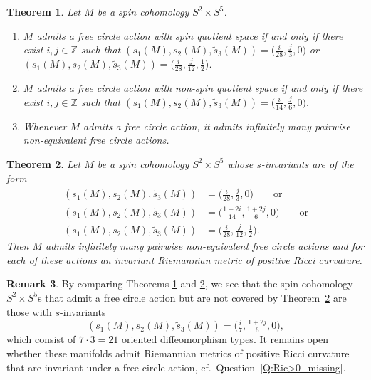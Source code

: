 \documentclass[pdftex]{sigma}
\numberwithin{equation}{section}
\newtheorem{Theorem}{Theorem}[section]
\theoremstyle{definition}
\newtheorem{Remark}[Theorem]{Remark}
\numberwithin{table}{section}
\newcommand{\Z}{\mathbb{Z}}
\begin{document}
\begin{Theorem}\label{T:free_circle_s}
	Let $M$ be a spin cohomology $S^2\times S^5$.
	\begin{enumerate}\itemsep=0pt
		\item[$(1)$] $M$ admits a free circle action with spin quotient space if and only if there exist $i,j\in\Z$ such that
$(s_1(M),s_2(M),\tilde{s}_3(M))=\bigl(\tfrac{i}{28}, \tfrac{j}{3},0 \bigr)$ or $(s_1(M),s_2(M),\tilde{s}_3(M))=\bigl(\tfrac{i}{28}, \tfrac{j}{12},\tfrac{1}{2} \bigr)$.
		\item[$(2)$] $M$ admits a free circle action with non-spin quotient space if and only if there exist $i,j\in\Z$ such that
$(s_1(M),s_2(M),\tilde{s}_3(M))=\bigl(\tfrac{i}{14}, \tfrac{j}{6},0 \bigr)$.
		\item[$(3)$] Whenever $M$ admits a free circle action, it admits infinitely many pairwise non-equivalent free circle actions.
	\end{enumerate}
\end{Theorem}

\begin{Theorem}\label{T:Ric>0_s}
	Let $M$ be a spin cohomology $S^2\times S^5$ whose $s$-invariants are of the form
	\begin{align*}
		(s_1(M),s_2(M),\tilde{s}_3(M))&= \bigl(\tfrac{i}{28}, \tfrac{j}{3},0 \bigr)\qquad\text{or}\\
		(s_1(M),s_2(M),\tilde{s}_3(M))&= \bigl(\tfrac{1+2i}{14}, \tfrac{1+2j}{6},0 \bigr)\qquad\text{or}\\
		(s_1(M),s_2(M),\tilde{s}_3(M))&= \bigl(\tfrac{i}{28}, \tfrac{j}{12},\tfrac{1}{2} \bigr).%
	\end{align*}
	Then $M$ admits infinitely many pairwise non-equivalent free circle actions and for each of these actions an invariant Riemannian metric of positive Ricci curvature.
\end{Theorem}

\begin{Remark}\label{R:Ric>0_missing}
	By comparing Theorems \ref{T:free_circle_s} and \ref{T:Ric>0_s}, we see that the spin cohomology $S^2\times S^5$s that admit a free circle action but are not covered by Theorem~\ref{T:Ric>0_s} are those with $s$-invariants
	\[ (s_1(M),s_2(M),\tilde{s}_3(M))=\bigl(\tfrac{i}{7},\tfrac{1+2j}{6},0\bigr), \]
	which consist of $7\cdot3=21$ oriented diffeomorphism types. It remains open whether these manifolds admit Riemannian metrics of positive Ricci curvature that are invariant under a free circle action, cf.\ Question~\ref{Q:Ric>0_missing}.
\end{Remark}
\end{document}
